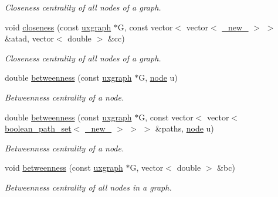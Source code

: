 \begin{DoxyCompactItemize}
\begin{DoxyCompactList}\small\item\em Closeness centrality of all nodes of a graph. \end{DoxyCompactList}\item 
void \hyperlink{namespacelgraph_1_1networks_1_1metrics_1_1centralities_aa98251b824fed2baa439258fae6dcc48}{closeness} (const \hyperlink{classlgraph_1_1utils_1_1uxgraph}{uxgraph} $\ast$G, const vector$<$ vector$<$ \hyperlink{namespacelgraph_1_1utils_a2c84bfde888c42ab3ad6b2cb8a364240}{\+\_\+new\+\_\+} $>$ $>$ \&atad, vector$<$ double $>$ \&cc)
\begin{DoxyCompactList}\small\item\em Closeness centrality of all nodes of a graph. \end{DoxyCompactList}\item 
double \hyperlink{namespacelgraph_1_1networks_1_1metrics_1_1centralities_a0834cb72864b1bdf574c212c5cafbce9}{betweenness} (const \hyperlink{classlgraph_1_1utils_1_1uxgraph}{uxgraph} $\ast$G, \hyperlink{namespacelgraph_1_1utils_a7bd66ede3805ef121bc2835bd48de0cf}{node} u)
\begin{DoxyCompactList}\small\item\em Betweenness centrality of a node. \end{DoxyCompactList}\item 
double \hyperlink{namespacelgraph_1_1networks_1_1metrics_1_1centralities_a2fb3b0c2d3cc9e44b7a979478d9e4d05}{betweenness} (const \hyperlink{classlgraph_1_1utils_1_1uxgraph}{uxgraph} $\ast$G, const vector$<$ vector$<$ \hyperlink{namespacelgraph_1_1utils_aaf50131e15d771a45620336d6e7a77f8}{boolean\+\_\+path\+\_\+set}$<$ \hyperlink{namespacelgraph_1_1utils_a2c84bfde888c42ab3ad6b2cb8a364240}{\+\_\+new\+\_\+} $>$ $>$ $>$ \&paths, \hyperlink{namespacelgraph_1_1utils_a7bd66ede3805ef121bc2835bd48de0cf}{node} u)
\begin{DoxyCompactList}\small\item\em Betweenness centrality of a node. \end{DoxyCompactList}\item 
void \hyperlink{namespacelgraph_1_1networks_1_1metrics_1_1centralities_a8ef4d17ff1a5e329f7d1fc1f5d1b13c9}{betweenness} (const \hyperlink{classlgraph_1_1utils_1_1uxgraph}{uxgraph} $\ast$G, vector$<$ double $>$ \&bc)
\begin{DoxyCompactList}\small\item\em Betweenness centrality of all nodes in a graph. \end{DoxyCompactList}\item 

\end{DoxyCompactItemize}
